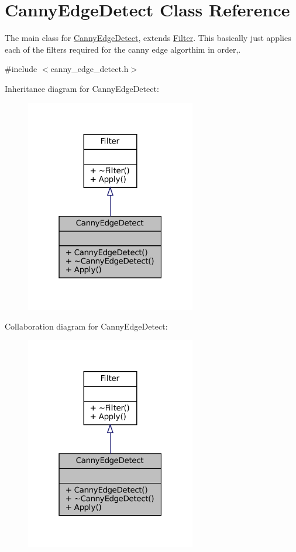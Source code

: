 \hypertarget{classCannyEdgeDetect}{}\section{Canny\+Edge\+Detect Class Reference}
\label{classCannyEdgeDetect}


The main class for \hyperlink{classCannyEdgeDetect}{Canny\+Edge\+Detect}, extends \hyperlink{classFilter}{Filter}. This basically just applies each of the filters required for the canny edge algorthim in order,.  




{\ttfamily \#include $<$canny\+\_\+edge\+\_\+detect.\+h$>$}



Inheritance diagram for Canny\+Edge\+Detect\+:\nopagebreak
\begin{figure}[H]
\begin{center}
\leavevmode
\includegraphics[width=211pt]{classCannyEdgeDetect__inherit__graph}
\end{center}
\end{figure}


Collaboration diagram for Canny\+Edge\+Detect\+:\nopagebreak
\begin{figure}[H]
\begin{center}
\leavevmode
\includegraphics[width=211pt]{classCannyEdgeDetect__coll__graph}
\end{center}
\end{figure}
